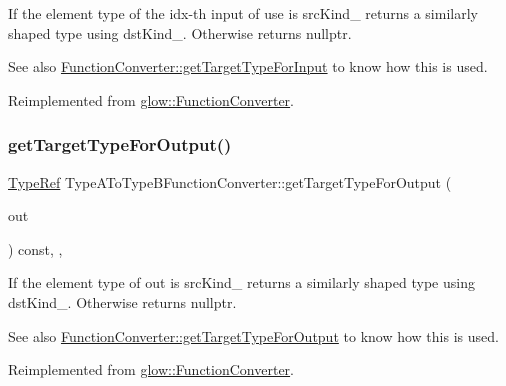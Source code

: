 If the element type of the {\ttfamily idx-\/th} input of {\ttfamily use} is src\+Kind\+\_\+ returns a similarly shaped type using dst\+Kind\+\_\+. Otherwise returns nullptr. \begin{DoxySeeAlso}{See also}
\hyperlink{classglow_1_1_function_converter_a2039ff94d1abe52dc89d3f7d3350c772}{Function\+Converter\+::get\+Target\+Type\+For\+Input} to know how this is used. 
\end{DoxySeeAlso}


Reimplemented from \hyperlink{classglow_1_1_function_converter_a2039ff94d1abe52dc89d3f7d3350c772}{glow\+::\+Function\+Converter}.

\mbox{\label{classglow_1_1_type_a_to_type_b_function_converter_a98b9d067d1afe5811ed48d38e5029d63}} 
\subsubsection{\texorpdfstring{get\+Target\+Type\+For\+Output()}{getTargetTypeForOutput()}}
{\footnotesize\ttfamily \hyperlink{structglow_1_1_type}{Type\+Ref} Type\+A\+To\+Type\+B\+Function\+Converter\+::get\+Target\+Type\+For\+Output (\begin{DoxyParamCaption}\item[{const \hyperlink{structglow_1_1_node_value}{Node\+Value} \&}]{out }\end{DoxyParamCaption}) const\hspace{0.3cm}{\ttfamily [override]}, {\ttfamily [protected]}, {\ttfamily [virtual]}}

If the element type of {\ttfamily out} is src\+Kind\+\_\+ returns a similarly shaped type using dst\+Kind\+\_\+. Otherwise returns nullptr. \begin{DoxySeeAlso}{See also}
\hyperlink{classglow_1_1_function_converter_a015dfed23796395ce34c7ca4766c7854}{Function\+Converter\+::get\+Target\+Type\+For\+Output} to know how this is used. 
\end{DoxySeeAlso}


Reimplemented from \hyperlink{classglow_1_1_function_converter_a015dfed23796395ce34c7ca4766c7854}{glow\+::\+Function\+Converter}.



